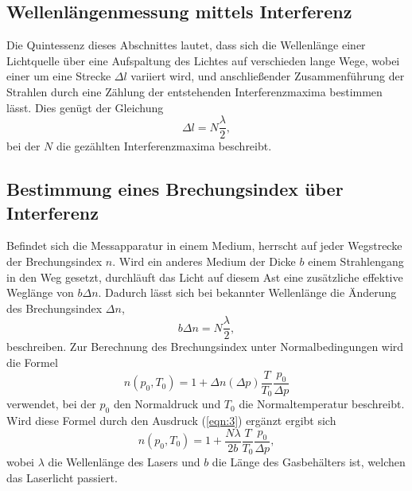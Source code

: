 

\subsection{Wellenlängenmessung mittels Interferenz}

Die Quintessenz dieses Abschnittes lautet, dass sich die Wellenlänge einer Lichtquelle über eine Aufspaltung des Lichtes auf verschieden lange Wege, wobei einer um eine Strecke $\Delta l$ variiert wird, und anschließender Zusammenführung der Strahlen durch eine Zählung der entstehenden Interferenzmaxima bestimmen lässt.
Dies genügt der Gleichung
\begin{equation}
  \Delta l = N\frac{\lambda}{2}, \label{eqn:2}
\end{equation}
bei der $N$ die gezählten Interferenzmaxima beschreibt.\\

\subsection{Bestimmung eines Brechungsindex über Interferenz}

Befindet sich die Messapparatur in einem Medium, herrscht auf jeder Wegstrecke der Brechungsindex $n$.
Wird ein anderes Medium der Dicke $b$ einem Strahlengang in den Weg gesetzt, durchläuft das Licht auf diesem Ast eine zusätzliche effektive Weglänge von $b\Delta n$.
Dadurch lässt sich bei bekannter Wellenlänge die Änderung des Brechungsindex $\Delta n$,
\begin{equation}
  b\Delta n = N\frac{\lambda}{2}, \label{eqn:3}
\end{equation}
beschreiben.
Zur Berechnung des Brechungsindex unter Normalbedingungen wird die Formel
\begin{equation}
  n(p_0,T_0) = 1 +\Delta n(\Delta p) \frac{T}{T_0}\frac{p_0}{\Delta p}
\end{equation}
verwendet, bei der $p_0$ den Normaldruck und $T_0$ die Normaltemperatur beschreibt.
Wird diese Formel durch den Ausdruck (\ref{eqn:3}) ergänzt ergibt sich
\begin{equation}
  n(p_0,T_0) = 1 +\frac{N \lambda}{2b} \frac{T}{T_0}\frac{p_0}{\Delta p}, \label{eqn:soso}
\end{equation}
wobei $\lambda$ die Wellenlänge des Lasers und $b$ die Länge des Gasbehälters ist, welchen das Laserlicht passiert.





